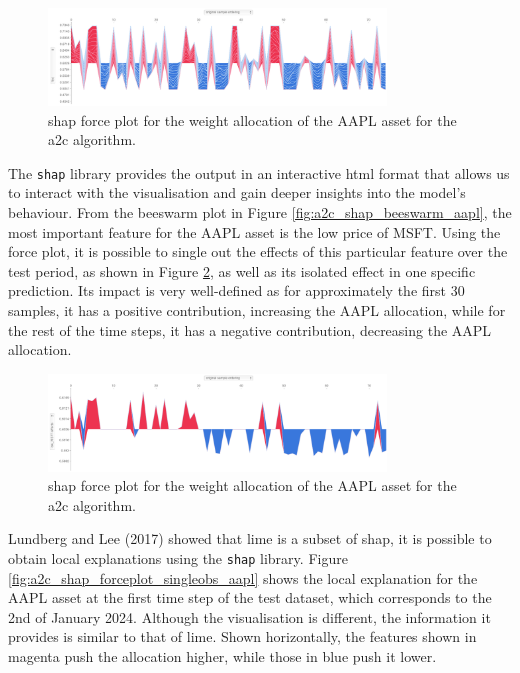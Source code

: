 \begin{figure}
    \centering
    \includegraphics[width=0.8\textwidth]{figures/a2c_shap_forceplot_aapl.png}
    \caption{\acrshort{shap} force plot for the weight allocation of the AAPL asset for the \acrshort{a2c} algorithm.}
    \label{fig:a2c_shap_forceplot_aapl}
\end{figure}

The \texttt{shap} library provides the output in an interactive \acrfull{html} format that allows us to interact with the visualisation and gain deeper insights into the model's behaviour. From the beeswarm plot in Figure \ref{fig:a2c_shap_beeswarm_aapl}, the most important feature for the AAPL asset is the low price of MSFT. Using the force plot, it is possible to single out the effects of this particular feature over the test period, as shown in Figure \ref{fig:a2c_shap_forceplot_aapl_lowmsft}, as well as its isolated effect in one specific prediction. Its impact is very well-defined as for approximately the first 30 samples, it has a positive contribution, increasing the AAPL allocation, while for the rest of the time steps, it has a negative contribution, decreasing the AAPL allocation.

\begin{figure}
    \centering
    \includegraphics[width=0.8\textwidth]{figures/a2c_shap_forceplot_aapl_lowmsft.png}
    \caption{\acrshort{shap} force plot for the weight allocation of the AAPL asset for the \acrshort{a2c} algorithm.}
    \label{fig:a2c_shap_forceplot_aapl_lowmsft}
\end{figure}

Lundberg and Lee (2017) \cite{Lundberg2017} showed that \acrshort{lime} is a subset of \acrshort{shap}, it is possible to obtain local explanations using the \texttt{shap} library. Figure \ref{fig:a2c_shap_forceplot_singleobs_aapl} shows the local explanation for the AAPL asset at the first time step of the test dataset, which corresponds to the 2nd of January 2024. Although the visualisation is different, the information it provides is similar to that of \acrshort{lime}. Shown horizontally, the features shown in magenta push the allocation higher, while those in blue push it lower. 

